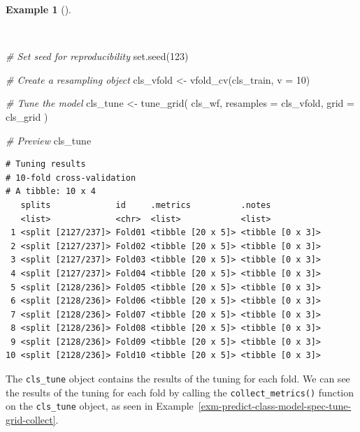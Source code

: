 \documentclass[
  letterpaper,
]{book}
\newenvironment{Shaded}{\begin{snugshade}}{\end{snugshade}}
\newcommand{\AttributeTok}[1]{\textcolor[rgb]{0.00,0.00,0.00}{#1}}
\newcommand{\CommentTok}[1]{\textcolor[rgb]{0.00,0.00,0.00}{\textit{#1}}}
\newcommand{\DecValTok}[1]{\textcolor[rgb]{0.00,0.00,0.00}{#1}}
\newcommand{\FunctionTok}[1]{\textcolor[rgb]{0.00,0.00,0.00}{#1}}
\newcommand{\NormalTok}[1]{\textcolor[rgb]{0.00,0.00,0.00}{#1}}
\newcommand{\OtherTok}[1]{\textcolor[rgb]{0.00,0.00,0.00}{#1}}
\theoremstyle{definition}
\newtheorem{example}{Example}[chapter]
\theoremstyle{remark}
\begin{document}
\begin{example}[]\protect\hypertarget{exm-predict-class-model-spec-tune-grid-cv}{}\label{exm-predict-class-model-spec-tune-grid-cv}

~

\begin{Shaded}
\begin{Highlighting}[]
\CommentTok{\# Set seed for reproducibility}
\FunctionTok{set.seed}\NormalTok{(}\DecValTok{123}\NormalTok{)}

\CommentTok{\# Create a resampling object}
\NormalTok{cls\_vfold }\OtherTok{\textless{}{-}} \FunctionTok{vfold\_cv}\NormalTok{(cls\_train, }\AttributeTok{v =} \DecValTok{10}\NormalTok{)}

\CommentTok{\# Tune the model}
\NormalTok{cls\_tune }\OtherTok{\textless{}{-}}
  \FunctionTok{tune\_grid}\NormalTok{(}
\NormalTok{    cls\_wf,}
    \AttributeTok{resamples =}\NormalTok{ cls\_vfold,}
    \AttributeTok{grid =}\NormalTok{ cls\_grid}
\NormalTok{    )}

\CommentTok{\# Preview}
\NormalTok{cls\_tune}
\end{Highlighting}
\end{Shaded}

\begin{verbatim}
# Tuning results
# 10-fold cross-validation 
# A tibble: 10 x 4
   splits             id     .metrics          .notes          
   <list>             <chr>  <list>            <list>          
 1 <split [2127/237]> Fold01 <tibble [20 x 5]> <tibble [0 x 3]>
 2 <split [2127/237]> Fold02 <tibble [20 x 5]> <tibble [0 x 3]>
 3 <split [2127/237]> Fold03 <tibble [20 x 5]> <tibble [0 x 3]>
 4 <split [2127/237]> Fold04 <tibble [20 x 5]> <tibble [0 x 3]>
 5 <split [2128/236]> Fold05 <tibble [20 x 5]> <tibble [0 x 3]>
 6 <split [2128/236]> Fold06 <tibble [20 x 5]> <tibble [0 x 3]>
 7 <split [2128/236]> Fold07 <tibble [20 x 5]> <tibble [0 x 3]>
 8 <split [2128/236]> Fold08 <tibble [20 x 5]> <tibble [0 x 3]>
 9 <split [2128/236]> Fold09 <tibble [20 x 5]> <tibble [0 x 3]>
10 <split [2128/236]> Fold10 <tibble [20 x 5]> <tibble [0 x 3]>
\end{verbatim}

\end{example}

The \texttt{cls\_tune} object contains the results of the tuning for
each fold. We can see the results of the tuning for each fold by calling
the \texttt{collect\_metrics()} function on the \texttt{cls\_tune}
object, as seen in
Example~\ref{exm-predict-class-model-spec-tune-grid-collect}.
\end{document}
